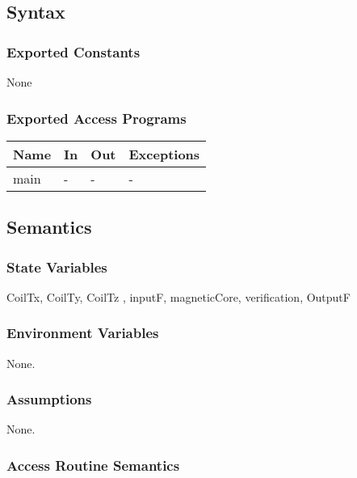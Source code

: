 \documentclass[12pt, titlepage]{article}
\begin{document}
\subsection{Syntax}

\subsubsection{Exported Constants}
None
\subsubsection{Exported Access Programs}

\begin{center}
\begin{tabular}{p{6cm} p{4cm} p{3cm} p{2cm}}
\hline
\textbf{Name} & \textbf{In} & \textbf{Out} & \textbf{Exceptions} \\
\hline
main  & - & - & - \\
\hline
\end{tabular}
\end{center}

\subsection{Semantics}

\subsubsection{State Variables}
CoilTx,  CoilTy,  CoilTz , inputF, magneticCore, verification, OutputF
\subsubsection{Environment Variables}
None.
\subsubsection{Assumptions}
None.

\subsubsection{Access Routine Semantics}
\end{document}
